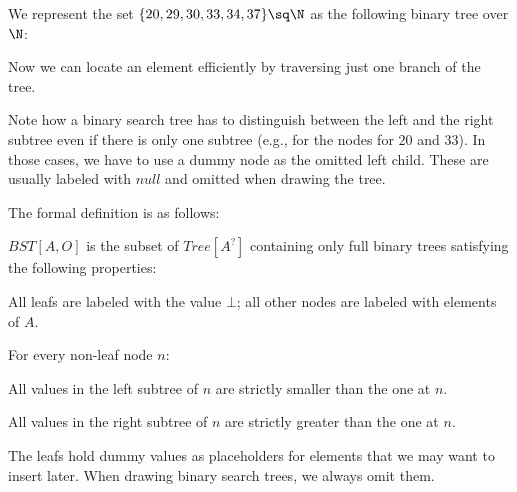 \begin{example}
We represent the set $\{20,29,30,33,34,37\}\sq \N$ as the following binary tree over $\N$:

\begin{center}
\end{center}
Now we can locate an element efficiently by traversing just one branch of the tree.

Note how a binary search tree has to distinguish between the left and the right subtree even if there is only one subtree (e.g., for the nodes for $20$ and $33$).
In those cases, we have to use a dummy node as the omitted left child.
These are usually labeled with $null$ and omitted when drawing the tree.
\end{example}

The formal definition is as follows:

\begin{definition}
$BST[A,O]$ is the subset of $Tree[A^?]$ containing only full binary trees satisfying the following properties:
\begin{compactitem}
 \item All leafs are labeled with the value $\bot$; all other nodes are labeled with elements of $A$.
 \item For every non-leaf node $n$:
  \begin{compactitem}
    \item All values in the left subtree of $n$ are strictly smaller than the one at $n$.
    \item All values in the right subtree of $n$ are strictly greater than the one at $n$.
  \end{compactitem}
\end{compactitem}
\end{definition}

The leafs hold dummy values as placeholders for elements that we may want to insert later.
When drawing binary search trees, we always omit them.

